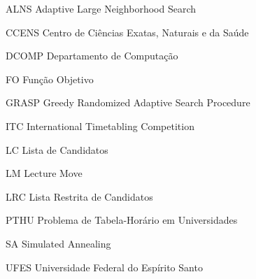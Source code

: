 \documentclass[
	12pt,				%
	openright,			%
	oneside,			%
	a4paper,			%
	english,			%
	french,				%
	spanish,			%
	brazil				%
	]{abntex2}
\begin{document}
\begin{siglas}
  \item[ALNS] Adaptive Large Neighborhood Search
  \item[CCENS] Centro de Ciências Exatas, Naturais e da Saúde
  \item[DCOMP] Departamento de Computação
  \item[FO] Função Objetivo
  \item[GRASP] Greedy Randomized Adaptive Search Procedure
  \item[ITC] International Timetabling Competition
  \item[LC] Lista de Candidatos
  \item[LM] Lecture Move
  \item[LRC] Lista Restrita de Candidatos
  \item[PTHU] Problema de Tabela-Horário em Universidades
  \item[SA] Simulated Annealing
  \item[UFES] Universidade Federal do Espírito Santo


\end{siglas}

\tableofcontents*
\cleardoublepage




\textual











\postextual
\end{document}
